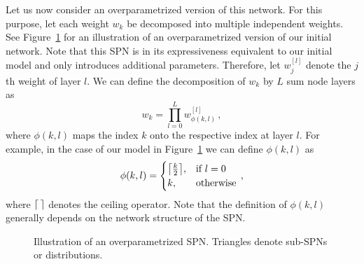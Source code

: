 \documentclass{article}
\DeclarePairedDelimiter\ceil{\lceil}{\rceil}
\begin{document}
Let us now consider an overparametrized version of this network.
For this purpose, let each weight $w_k$ be decomposed into multiple independent weights.
See Figure~\ref{fig:deep} for an illustration of an overparametrized version of our initial network.
Note that this SPN is in its expressiveness equivalent to our initial model and only introduces additional parameters.
Therefore, let $w^{[l]}_{j}$ denote the $j$th weight of layer $l$.
We can define the decomposition of $w_k$ by $L$ sum node layers as
\begin{equation} \label{eq:decomposition}
w_k = \prod_{l=0}^L w^{[l]}_{\phi(k, l)} \, ,
\end{equation}
where $\phi(k, l)$ maps the index $k$ onto the respective index at layer $l$.
For example, in the case of our model in Figure~\ref{fig:deep} we can define $\phi(k, l)$ as
\[
    \phi(k, l) =
\begin{cases}
    \ceil*{\frac{k}{2}} ,& \text{if } l = 0\\
    k, & \text{otherwise}
\end{cases} \, ,
\]
where $\ceil*{\,}$ denotes the ceiling operator.
Note that the definition of $\phi(k, l)$ generally depends on the network structure of the SPN.

\begin{figure}[t]
  \centering
  
  \caption{Illustration of an overparametrized SPN. Triangles denote sub-SPNs or distributions.}
  \label{fig:deep}
\end{figure}
\end{document}
